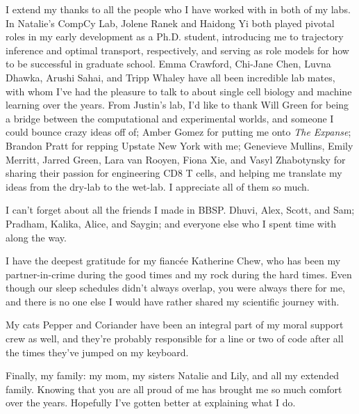 I extend my thanks to all the people who I have worked with in both of my labs. In Natalie's CompCy Lab, Jolene Ranek and Haidong Yi both played pivotal roles in my early development as a Ph.D. student, introducing me to trajectory inference and optimal transport, respectively, and serving as role models for how to be successful in graduate school. Emma Crawford, Chi-Jane Chen, Luvna Dhawka, Arushi Sahai, and Tripp Whaley have all been incredible lab mates, with whom I've had the pleasure to talk to about single cell biology and machine learning over the years. From Justin's lab, I'd like to thank Will Green for being a bridge between the computational and experimental worlds, and someone I could bounce crazy ideas off of; Amber Gomez for putting me onto \textit{The Expanse}; Brandon Pratt for repping Upstate New York with me; Genevieve Mullins, Emily Merritt, Jarred Green, Lara van Rooyen, Fiona Xie, and Vasyl Zhabotynsky for sharing their passion for engineering CD8 T cells, and helping me translate my ideas from the dry-lab to the wet-lab. I appreciate all of them so much.

I can't forget about all the friends I made in BBSP. Dhuvi, Alex, Scott, and Sam; Pradham, Kalika, Alice, and Saygin; and everyone else who I spent time with along the way.

I have the deepest gratitude for my fianc\'ee Katherine Chew, who has been my partner-in-crime during the good times and my rock during the hard times. Even though our sleep schedules didn't always overlap, you were always there for me, and there is no one else I would have rather shared my scientific journey with. 

My cats Pepper and Coriander have been an integral part of my moral support crew as well, and they're probably responsible for a line or two of code after all the times they've jumped on my keyboard.

Finally, my family: my mom, my sisters Natalie and Lily, and all my extended family. Knowing that you are all proud of me has brought me so much comfort over the years. Hopefully I've gotten better at explaining what I do.

\clearpage
